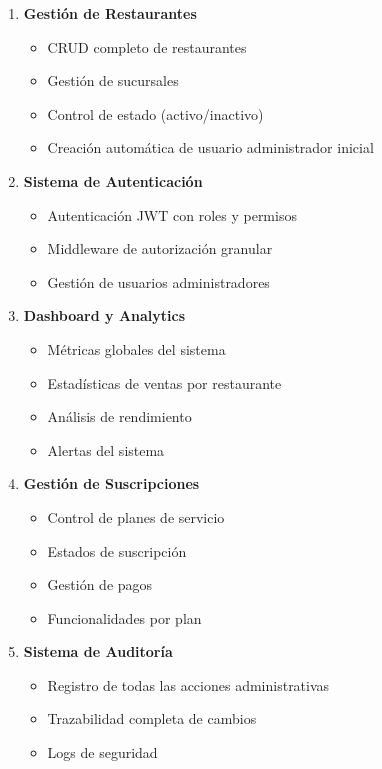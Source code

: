 \documentclass[12pt,a4paper]{article}
\begin{document}
\begin{enumerate}
    \item \textbf{Gestión de Restaurantes}
    \begin{itemize}
        \item CRUD completo de restaurantes
        \item Gestión de sucursales
        \item Control de estado (activo/inactivo)
        \item Creación automática de usuario administrador inicial
    \end{itemize}
    
    \item \textbf{Sistema de Autenticación}
    \begin{itemize}
        \item Autenticación JWT con roles y permisos
        \item Middleware de autorización granular
        \item Gestión de usuarios administradores
    \end{itemize}
    
    \item \textbf{Dashboard y Analytics}
    \begin{itemize}
        \item Métricas globales del sistema
        \item Estadísticas de ventas por restaurante
        \item Análisis de rendimiento
        \item Alertas del sistema
    \end{itemize}
    
    \item \textbf{Gestión de Suscripciones}
    \begin{itemize}
        \item Control de planes de servicio
        \item Estados de suscripción
        \item Gestión de pagos
        \item Funcionalidades por plan
    \end{itemize}
    
    \item \textbf{Sistema de Auditoría}
    \begin{itemize}
        \item Registro de todas las acciones administrativas
        \item Trazabilidad completa de cambios
        \item Logs de seguridad
    \end{itemize}
\end{enumerate}
\end{document}
